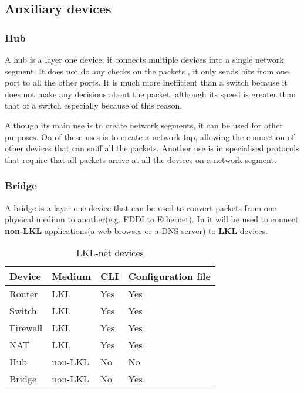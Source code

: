 \subsection{Auxiliary devices}
\label{sub-sec:auxdev}

\subsubsection{Hub}

A hub is a layer one device; it connects multiple devices into a single network segment. It does not do any checks on the packets
, it only sends bits from one port to all the other ports.  It is much more inefficient than a switch 
because it does not make any decisions about the packet, although its speed is greater than that of a switch especially because
of this reason.

Although its main use is to create network segments, it can be used for other purposes. 
On of these uses is to create a network tap, allowing the connection of other devices 
that can sniff all the packets. Another use is in specialised protocols that require 
that all packets arrive at all the devices on a network segment.

\subsubsection{Bridge}

A bridge is a layer one device that can be used to convert packets from one physical 
medium to another(e.g. FDDI to Ethernet). In \textbf{\project} it will be used to connect 
\textbf{non-LKL} applications(a web-browser or a DNS server) to \textbf{LKL} devices.

\begin{center}
  \begin{table}[htb]
  \begin{center}
  \begin{tabular}{ | l | l | l | l |}
    \hline
      \textbf{Device} & \textbf{Medium} & \textbf{CLI} & \textbf{Configuration file} \\ \hline
      Router & LKL & Yes & Yes \\ \hline
      Switch & LKL & Yes & Yes \\ \hline
      Firewall & LKL & Yes & Yes\\ \hline
      NAT & LKL & Yes & Yes \\ \hline
      Hub & non-LKL & No & No \\ \hline
      Bridge & non-LKL & No & Yes \\ 
    \hline
  \end{tabular}
  \end{center}
  \caption{LKL-net devices}
  \label{table:tdevices}
  \end{table}
\end{center}

